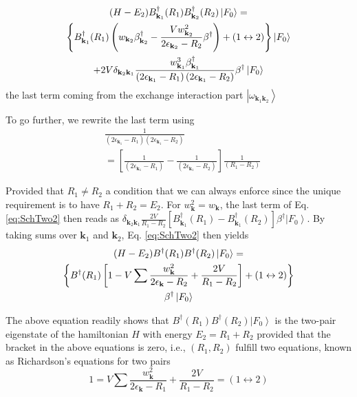 \documentclass[aps,prb,superscriptaddress,showpacs,reprint,lengthcheck]{revtex4-1}
\begin{document}
\begin{multline}  \label{eq:SchTwo2}
(H-E _2)B^{\dagger}_{\mathbf{k} _1}(R_1)B^{\dagger}_{\mathbf{k}
_2}(R_2)\left|F_0\right>   = \\
\left\{B^{\dagger}_{\mathbf{k} _1}(R_1)\left(w_{\mathbf{k}
_2}\beta^{\dagger}_{\mathbf{k} _2}-\frac{Vw_{\mathbf{k} _2}^2}{2\epsilon_{%
\mathbf{k} _2}-R_2}\beta^{\dagger}\right)+(1\leftrightarrow2)\right\}
\left|F_0\right>  \\
+2V\delta_{{\mathbf{k} _2}{\mathbf{k} _1}}\frac{w^3_{{\mathbf{k} _1}}\beta^\dagger_{{\mathbf{k} _1}}}{\left(2%
\epsilon_{\mathbf{k} _1}-R_1\right) \left(2\epsilon_{\mathbf{k}
_1}-R_2\right)}\beta^\dagger\left|F_0\right>  
\end{multline}
the last term coming from the exchange interaction part $\left|\omega_{\mathbf{k} _1\mathbf{k} _2}\right>$

To go further, we rewrite the last term using 
\begin{equation}\label{eq:inverse}
\begin{split}
&\frac{1}{\left(2\epsilon_{\mathbf{k} _1}-R_1\right)
\left(2\epsilon_{\mathbf{k} _1}-R_2\right)}\\&=\left[
\frac{1}{\left(2\epsilon_{\mathbf{k} _1}-R_1\right)}-\frac{1}{\left(2\epsilon_{\mathbf{k}
_1}-R_2\right) }\right]\frac1{\left(R_1-R_2\right) } 
\end{split}
\end{equation}

Provided that $R_1\neq{}R_2$
a condition that we can always enforce since the unique requirement is to have $R_1+R_2=E_2$. For $w^2_{{\mathbf{k} }}=w_{{\mathbf{k} }}$, the last term of Eq. \eqref{eq:SchTwo2} then reads as $\delta_{{\mathbf{k} _2}{\mathbf{k} _1}}\frac{2V}{R_1-R_2}[B^{\dagger}_{\mathbf{k} _1}(R_1)-B^{\dagger}_{\mathbf{k} _1}(R_2)]\beta^\dagger\left|F_0\right>  $. By taking sums over $\mathbf{k} _1$ and $\mathbf{k} _2$, Eq. %
\eqref{eq:SchTwo2} then yields 
\begin{multline}  \label{eq:SchTwo3}
(H-E_2)B^{\dagger}(R_1)B^{\dagger}(R_2)\left|F_0\right>   = \\
\left\{B^{\dagger}(R_1)\left[1-V\sum\frac{w_{\mathbf{k} }^2}{2\epsilon_{%
\mathbf{k} }-R_2}+\frac{2V}{R_1-R_2}\right] +(1\leftrightarrow2)\right\}  \\
\beta^{\dagger}\left|F_0\right>  
\end{multline}


The above equation readily shows that $B^{\dagger}(R_1)B^{\dagger}(R_2)%
\left|F_0\right>  $ is the two-pair eigenstate of the hamiltonian $H$ with  energy $%
E _2=R_1+R_2$ provided that the bracket in the above equations is zero, i.e., $\left(R_1,R_2\right) $ fulfill two
equations, known as Richardson's equations for two pairs 
\begin{equation}
1=V\sum\frac{w_{\mathbf{k} }^2}{2\epsilon_{\mathbf{k} }-R_1}+\frac{2V}{R_1-R_2}%
=(1\leftrightarrow2)
\end{equation}
\end{document}
